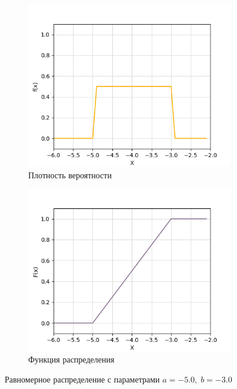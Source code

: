 \begin{figure}[H]
	\begin{subfigure}{.5\textwidth}
		\centering
		\includegraphics[width=.8\linewidth]{assets/unipdf-5-3.png}
		\caption{Плотность вероятности}
		\label{fig:unipdf-5-3}
	\end{subfigure}%
	\begin{subfigure}{.5\textwidth}
		\centering
		\includegraphics[width=.8\linewidth]{assets/unicdf-5-3.png}
		\caption{Функция распределения}
		\label{fig:unicdf-5-3}
	\end{subfigure}
	\caption{Равномерное распределение с параметрами $a = -5.0, \; b = -3.0$}
	\label{fig:uni-5-3}
\end{figure}
